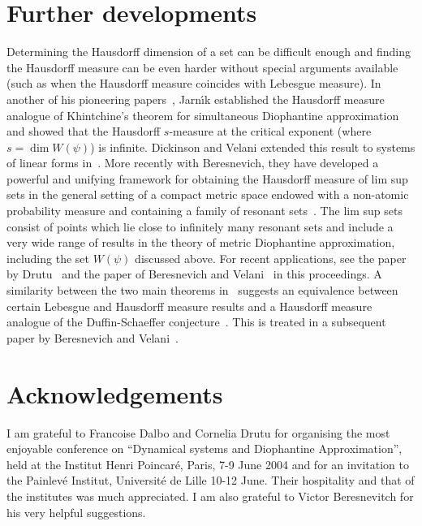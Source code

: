 \documentclass[reqno]{amsart}
\newcommand{\0}{{\mathbf{0}}}
\newcommand{\DA}{Diophantine approximation}
\newcommand{\HM}{Hausdorff measure}
\newcommand{\Ja}{Jarn\'{\i}k}
\newcommand{\K}{Khintchine}
\begin{document}
\section{Further developments}
\label{sec:FD}
Determining the Hausdorff dimension of a set can be difficult enough
and finding the Hausdorff measure can be even harder without special
arguments available (such as when the Hausdorff measure coincides with
Lebesgue measure).  In another of his pioneering papers~\cite{Ja29},
\Ja{} established the \HM{} analogue of \K's theorem for simultaneous
\DA {} and showed that the Hausdorff $s$-measure at the critical
exponent (where $s=\dim W(\psi)$) is infinite. Dickinson and Velani
extended this result to systems of linear forms in~\cite{HDSV97}.
More recently with Beresnevich, they have developed a powerful and
unifying framework for obtaining the Hausdorff measure of lim sup sets
in the general setting of a compact metric space endowed with a
non-atomic probability measure and containing a family of resonant
sets~\cite{BDV06}.  The lim sup sets consist of points which lie close
to infinitely many resonant sets and include a very wide range of
results in the theory of metric \DA, including the set $W(\psi)$
discussed above. For recent applications, see the paper by
Drutu~\cite{drutu05} and the paper of Beresnevich and
Velani~\cite{BVParis07} in this proceedings. A similarity between the two
main theorems in~\cite{BDV06} suggests an equivalence between certain
Lebesgue and Hausdorff measure results and a Hausdorff measure
analogue of the Duffin-Schaeffer
conjecture~\cite{DuffinSchaeffer,PV90}. This is treated in a
subsequent paper by Beresnevich and Velani~\cite{BV06}.

\section{Acknowledgements}
I am grateful to Francoise Dalbo and Cornelia Drutu for organising the
most enjoyable conference on ``Dynamical systems and Diophantine
Approximation'', held at the Institut Henri Poincar\'e, Paris, 7-9
June 2004 and for an invitation to the Painlev\'e Institut,
Universit\'e de Lille 10-12 June. Their hospitality and that of the
institutes was much appreciated.  I am also grateful to Victor
Beresnevitch for his very helpful suggestions.



\end{document}
